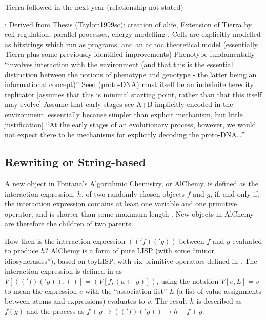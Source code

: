 Tierra followed in the next year (relationship not stated) \parencite{Ofria2004}


\parencite{Taylor2001}:
Derived from Thesis (Taylor:1999sc): creation of \gls{alife}, Extension of Tierra \cite{Ray1991} by cell regulation, parallel processes, energy modelling \cite[p.4]{Taylor:1999sc}, Cells are explicitly modelled as bitstrings which run as programs, and an adhoc theoretical model (essentially Tierra plus some previously identified improvements)
Phenotype fundamentally ``involves interaction with the environment (and that this is the essential distinction between the notions of phenotype and genotype - the latter being an informational concept)'' \parencite{Taylor2001}
Seed (proto-DNA) must itself be an indefinite heredity replicator {[}assumes that this is minimal starting point, rather than that this itself may evolve{]} \parencite{Taylor2001}
Assume that early stages see A+B implicitly encoded in the environment {[}essentially because simpler than explicit mechanism, but little justification{]} ``At the early stages of an evolutionary process, however, we would not expect there to be mechanisms for explicitly decoding the proto-DNA\ldots{}'' \parencite{Taylor2001}
		
\subsection{Rewriting or String-based}

\cite{Fontana1992}

A new object in Fontana's Algorithmic Chemistry, or AlChemy, is defined as the interaction expression, $h$, of two randomly chosen objects $f$ and $g$, if, and only if, the interaction expression contains at least one variable and one primitive operator, and is shorter than some maximum length \parencite[p.173--p.180]{Fontana1992}. New objects in AlChemy are therefore the children of two parents.

How then is the interaction expression $(('f)('g))$ between $f$ and $g$ evaluated to produce $h$? AlChemy is a form of pure LISP (with some ``minor idiosyncrasies''), based on toyLISP, with six primitive operators defined in \cite[p.205]{Fontana1992}. The interaction expression is defined in \cite[Definition A.9, p.204]{Fontana1992} as $V[(('f)('g)),()] = (V[f,(a\leftarrow g)])$, using the notation $V[e,L]=v$ to mean the expression $e$ with the ``association list'' $L$ (a list of value assignments between atoms and expressions) evaluates to $v$. The result $h$ is described as $f(g)$ and the process as $f+g \rightarrow (('f)('g)) \rightarrow h + f + g$.

